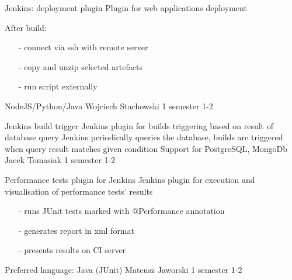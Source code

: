 \begin{project}
{Jenkins: deployment plugin}
{Plugin for web applications deployment} 
{ 
After build:
\begin{itemize}
\item[-] connect via ssh with remote server
\item[-] copy and unzip selected artefacts
\item[-] run script externally
\end{itemize}
}
{NodeJS/Python/Java}
{Wojciech Stachowski}
{1 semester}
{1-2}
\end{project}
\begin{project}
{Jenkins build trigger}
{Jenkins plugin for builds triggering based on result of database query} 
{ 
Jenkins periodically queries the database, builds are triggered when query result matches given condition
}
{Support for PostgreSQL, MongoDb}
{Jacek Tomasiak}
{1 semester}
{1-2}
\end{project}
\begin{project}
{Performance tests plugin for Jenkins}
{Jenkins plugin for execution and visualisation of performance tests' results} 
{ 
\begin{itemize}
\item[-] runs JUnit tests marked with @Performance annotation
\item[-] generates report in xml format
\item[-] presents results on CI server
\end{itemize}
}
{Preferred language: Java (JUnit)}
{Mateusz Jaworski}
{1 semester}
{1-2}
\end{project}
